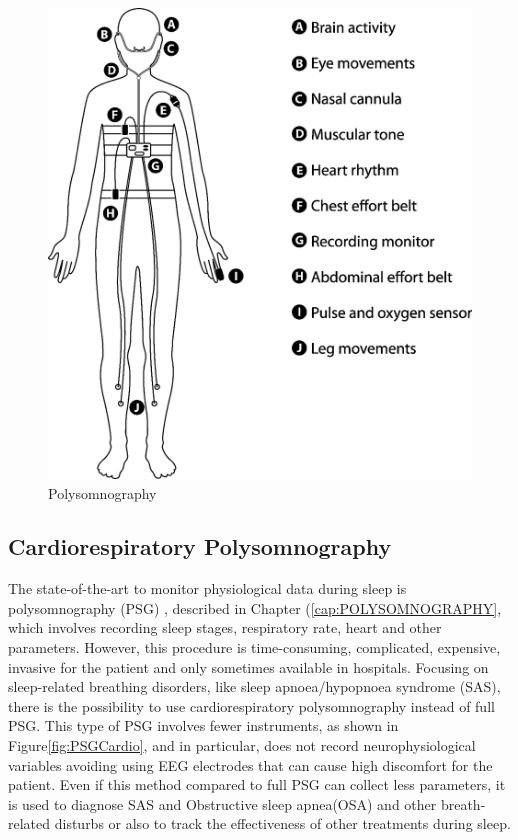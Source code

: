 \begin{figure}[p]
    \centering
    \includegraphics[width=\textwidth]{img/PSG test.png}
    \caption{Polysomnography}
    \label{fig:PSGComplete}
\end{figure}

\subsection{Cardiorespiratory Polysomnography} \label{cap:cardiorespiratory}
The state-of-the-art to monitor physiological data during sleep is polysomnography (PSG) \cite{Penzel2016ModulationsPolysomnography}, described in Chapter (\ref{cap:POLYSOMNOGRAPHY}, which involves recording sleep stages, respiratory rate, heart and other parameters. However, this procedure is time-consuming, complicated, expensive, invasive for the patient and only sometimes available in hospitals. 
Focusing on sleep-related breathing disorders, like sleep apnoea/hypopnoea syndrome (SAS), there is the possibility to use cardiorespiratory polysomnography instead of full PSG. This type of PSG involves fewer instruments, as shown in Figure\ref{fig:PSGCardio}, and in particular, does not record neurophysiological variables avoiding using EEG electrodes that can cause high discomfort for the patient.  
Even if this method compared to full PSG can collect less parameters, it is used to diagnose SAS \cite{Calleja1505} and Obstructive sleep apnea(OSA) and other breath-related disturbs or also to track the effectiveness of other treatments during sleep.

